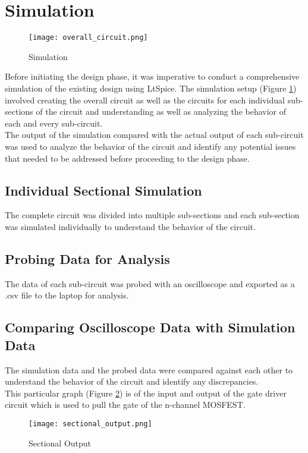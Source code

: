 \section{Simulation}
\begin{figure}[ht]
    \centering
    \texttt{[image: overall\_circuit.png]}
    \caption{Simulation}
    \label{fig:Simulation}
\end{figure}
\noindent
Before initiating the design phase, it was imperative to conduct a
comprehensive simulation of the existing design using LtSpice. The simulation
setup (Figure \ref{fig:Simulation}) involved creating the overall circuit as well as the circuits for each
individual sub-sections of the circuit and understanding as well as analyzing
the behavior of each and every sub-circuit.\\
\noindent
The output of the simulation compared with the actual output of each sub-circuit was used to analyze the behavior of the circuit and identify any potential issues that needed to be addressed before proceeding to the design phase.

\subsection{Individual Sectional Simulation}
The complete circuit was divided into multiple sub-sections and each sub-section was simulated individually to understand the behavior of the circuit.

\subsection{Probing Data for Analysis}
The data of each sub-circuit was probed with an oscilloscope and exported as a .csv file to the laptop for analysis.

\subsection{Comparing Oscilloscope Data with Simulation Data}
The simulation data and the probed data were compared against each other to understand the behavior of the circuit and identify any discrepancies.\\
\noindent
This particular graph (Figure \ref*{fig:Sectional Output}) is of the input and output of the gate driver circuit which is used to pull the gate of the n-channel MOSFEST.
\begin{figure}[ht]
    \centering
    \texttt{[image: sectional\_output.png]}
    \caption{Sectional Output}
    \label{fig:Sectional Output}
\end{figure}


